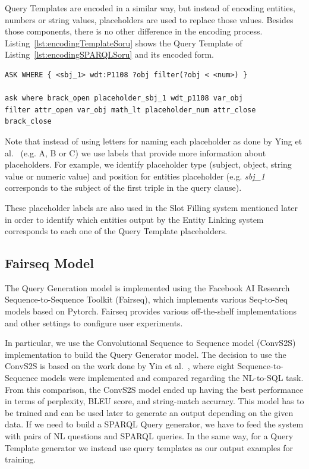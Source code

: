 Query Templates are encoded in a similar way, but instead of encoding entities, numbers or 
string values, placeholders are used to replace those values. Besides those components, there 
is no other difference in the encoding process. Listing~\ref{lst:encodingTemplateSoru} shows 
the Query Template of Listing~\ref{lst:encodingSPARQLSoru} and its encoded form.

\begin{lstlisting}[captionpos=b, 
    caption=SPARQL query example with its encoded form., 
    label=lst:encodingTemplateSoru,
    basicstyle=\ttfamily,frame=single]
ASK WHERE { <sbj_1> wdt:P1108 ?obj filter(?obj < <num>) }

ask where brack_open placeholder_sbj_1 wdt_p1108 var_obj 
filter attr_open var_obj math_lt placeholder_num attr_close brack_close
\end{lstlisting}

Note that instead of using letters for naming each placeholder as done by Ying et al.~\cite{nmt:nl-to-sparql-Yin19} 
(e.g. A, B or C) we use labels that provide more information about placeholders. For example, 
we identify placeholder type (subject, object, string value or numeric value) and position 
for entities placeholder (e.g. \textit{sbj\_1} corresponds to the subject of the first triple in the 
query clause).

These placeholder labels are also used in the Slot Filling system mentioned later in order to 
identify which entities output by the Entity Linking system corresponds to each one of the 
Query Template placeholders. 

\subsection{Fairseq Model}
\label{cap3:system/queryGenModule/fairseqModel}
The Query Generation model is implemented using the Facebook AI Research Sequence-to-Sequence 
Toolkit (Fairseq), which implements various Seq-to-Seq models based on Pytorch. Fairseq 
provides various off-the-shelf implementations and other settings to configure user 
experiments. 

In particular, we use the Convolutional Sequence to Sequence model (ConvS2S)~\cite{nmt:convS2S-GehringAGYD17} 
implementation to build the Query Generator model. The decision to use the ConvS2S is based 
on the work done by Yin et al.~\cite{nmt:nl-to-sparql-Yin19}, where eight Sequence-to-Sequence 
models were implemented and compared regarding the NL-to-SQL task. From this comparison, 
the ConvS2S model ended up having the best performance in terms of perplexity, BLEU score, 
and string-match accuracy. This model has to be trained and can be used later to generate an 
output depending on the given data. If we need to build a SPARQL Query generator, we have to 
feed the system with pairs of NL questions and SPARQL queries. In the same way, for a Query 
Template generator we instead use query templates as our output examples for training.

